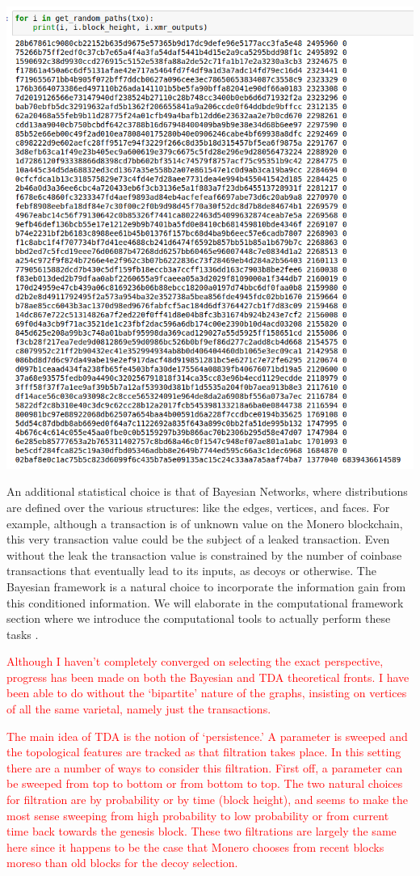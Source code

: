 \documentclass[prc, 12pt]{revtex4-1}
\begin{document}
\includegraphics[scale=0.5]{randompath}

An additional statistical choice is that of Bayesian Networks, where distributions are defined over the various structures: like the edges, vertices, and faces.  For example, although a transaction is of unknown value on the Monero blockchain, this very transaction value could be the subject of a leaked transaction.  Even without the leak the transaction value is constrained by the number of coinbase transactions that eventually lead to its inputs, as decoys or otherwise.  The Bayesian framework is a natural choice to incorporate the information gain from this conditioned information.  We will elaborate in the computational framework section where we introduce the computational tools to actually perform these tasks \cite{patil2010pymc}.

\textcolor{red}{
Although I haven't completely converged on selecting the exact perspective, progress has been made on both the Bayesian and TDA theoretical fronts.  I have been able to do without the `bipartite' nature of the graphs, insisting on vertices of all the same varietal, namely just the transactions.  
}

\textcolor{red}{The main idea of TDA is the notion of `persistence.'  A parameter is sweeped and the topological features are tracked as that filtration takes place.  In this setting there are a number of ways to consider this filtration.  First off, a parameter can be sweeped from top to bottom or from bottom to top.  The two natural choices for filtration are by probability or by time (block height), and seems to make the most sense sweeping from high probability to low probability or from current time back towards the genesis block.  These two filtrations are largely the same here since it happens to be the case that Monero chooses from recent blocks moreso than old blocks for the decoy selection.
}
\end{document}
